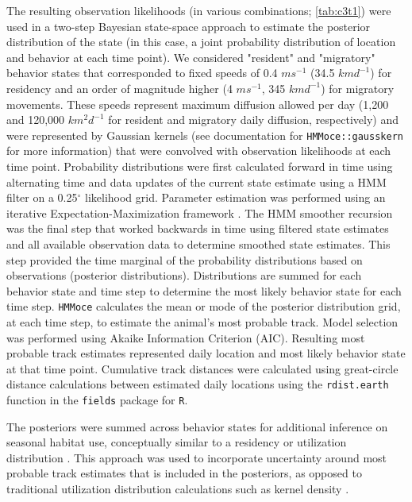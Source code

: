 The resulting observation likelihoods (in various combinations; \cref{tab:c3t1}) were used in a two-step Bayesian state-space approach to estimate the posterior distribution of the state (in this case, a joint probability distribution of location and behavior at each time point). We considered "resident" and "migratory" behavior states that corresponded to fixed speeds of 0.4 $m s^{-1}$ (34.5 $km d^{-1}$) for residency \citep[following ][]{Curtis2014} and an order of magnitude higher (4 $m s^{-1}$, 345 $km d^{-1}$) for migratory movements. These speeds represent maximum diffusion allowed per day (1,200 and 120,000 $km^2 d^{-1}$ for resident and migratory daily diffusion, respectively) and were represented by Gaussian kernels (see documentation for \texttt{HMMoce::gausskern} for more information) that were convolved with observation likelihoods at each time point. Probability distributions were first calculated forward in time using alternating time and data updates of the current state estimate using a HMM filter on a 0.25$^{\circ}$ likelihood grid. Parameter estimation was performed using an iterative Expectation-Maximization framework \citep{Woillez2016}. The HMM smoother recursion was the final step that worked backwards in time using filtered state estimates and all available observation data to determine smoothed state estimates. This step provided the time marginal of the probability distributions based on observations (posterior distributions). Distributions are summed for each behavior state and time step to determine the most likely behavior state for each time step. \texttt{HMMoce} calculates the mean or mode of the posterior distribution grid, at each time step, to estimate the animal's most probable track. Model selection was performed using Akaike Information Criterion (AIC). Resulting most probable track estimates represented daily location and most likely behavior state at that time point. Cumulative track distances were calculated using great-circle distance calculations between estimated daily locations using the \texttt{rdist.earth} function in the \texttt{fields} \citep{Douglas-Nychka2015} package for \texttt{R}.

The posteriors were summed across behavior states for additional inference on seasonal habitat use, conceptually similar to a residency \citep[see Eq. 5, ][]{Pedersen2011a} or utilization distribution \citep{Royle2008}. This approach was used to incorporate uncertainty around most probable track estimates that is included in the posteriors, as opposed to traditional utilization distribution calculations such as kernel density \citep[\emph{e.g.}][]{Berumen2014}.

